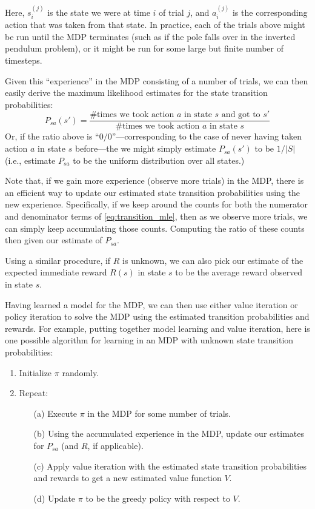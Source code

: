 Here, $s^{(j)}_i$ is the state we were at time $i$ of trial $j$, and $a^{(j)}_i$
is the corresponding action that was taken from that state. In practice, each of the
trials above might be run until the MDP terminates (such as if the pole falls
over in the inverted pendulum problem), or it might be run for some large
but finite number of timesteps.

Given this ``experience'' in the MDP consisting of a number of trials,
we can then easily derive the maximum likelihood estimates for the state
transition probabilities:
\begin{equation}\label{eq:transition_mle}
    P_{sa}(s') = \frac{\text{\# times we took action $a$ in state $s$ and got to $s'$}}{\text{\# times we took action $a$ in state $s$}} %
\end{equation}
Or, if the ratio above is ``$0/0$''---corresponding to the case of never having
taken action $a$ in state $s$ before---the we might simply estimate $P_{sa}(s')$ to be
$1/|S|$ (i.e., estimate $P_{sa}$ to be the uniform distribution over all states.) %

Note that, if we gain more experience (observe more trials) in the MDP,
there is an efficient way to update our estimated state transition probabilities
using the new experience. Specifically, if we keep around the counts for both
the numerator and denominator terms of \cref{eq:transition_mle}, then as we observe more trials,
we can simply keep accumulating those counts. Computing the ratio of these
counts then given our estimate of $P_{sa}$.

Using a similar procedure, if $R$ is unknown, we can also pick our estimate
of the expected immediate reward $R(s)$ in state $s$ to be the average reward
observed in state $s$.

Having learned a model for the MDP, we can then use either value
iteration or policy iteration to solve the MDP using the estimated transition
probabilities and rewards. For example, putting together model learning and
value iteration, here is one possible algorithm for learning in an MDP with
unknown state transition probabilities:
\begin{enumerate}
    \item Initialize $\pi$ randomly.
    \item Repeat:
    \begin{enumerate}
        \item[(a)] Execute $\pi$ in the MDP for some number of trials.
        \item[(b)] Using the accumulated experience in the MDP, update our estimates for $P_{sa}$ (and $R$, if applicable).
        \item[(c)] Apply value iteration with the estimated state transition probabilities and rewards to get a new estimated value function $V$.
        \item[(d)] Update $\pi$ to be the greedy policy with respect to $V$.
    \end{enumerate}
\end{enumerate}

